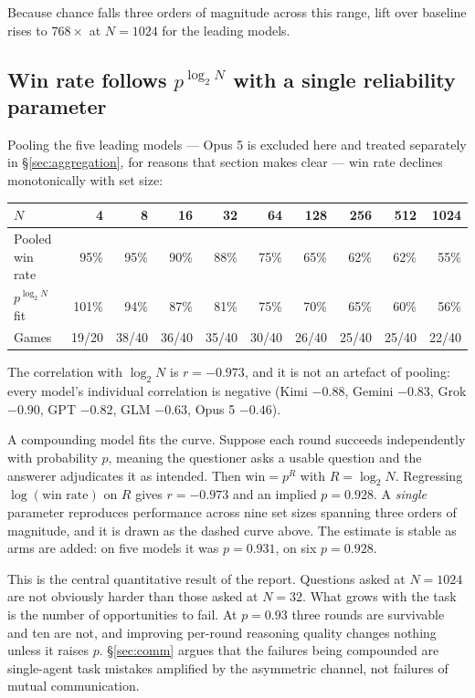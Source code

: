 \documentclass[11pt]{article}
\begin{document}
Because chance falls three orders of magnitude across this range, lift over
baseline rises to $768\times$ at $N=1024$ for the leading models.

\subsection{Win rate follows $p^{\log_2 N}$ with a single reliability parameter}
\label{sec:decay}

Pooling the five leading models --- Opus 5 is excluded here and treated separately
in \S\ref{sec:aggregation}, for reasons that section makes clear --- win rate
declines monotonically with set size:

\begin{center}\small
\begin{tabular}{lrrrrrrrrr}
\toprule
$N$ & 4 & 8 & 16 & 32 & 64 & 128 & 256 & 512 & 1024 \\
\midrule
Pooled win rate & 95\% & 95\% & 90\% & 88\% & 75\% & 65\% & 62\% & 62\% & 55\% \\
$p^{\log_2 N}$ fit & 101\% & 94\% & 87\% & 81\% & 75\% & 70\% & 65\% & 60\% & 56\% \\
Games & 19/20 & 38/40 & 36/40 & 35/40 & 30/40 & 26/40 & 25/40 & 25/40 & 22/40 \\
\bottomrule
\end{tabular}
\end{center}

The correlation with $\log_2 N$ is $r=-0.973$, and it is not an artefact of
pooling: every model's individual correlation is negative (Kimi $-0.88$, Gemini
$-0.83$, Grok $-0.90$, GPT $-0.82$, GLM $-0.63$, Opus 5 $-0.46$).

A compounding model fits the curve. Suppose each round succeeds independently
with probability $p$, meaning the questioner asks a usable question and the
answerer adjudicates it as intended. Then $\text{win} = p^{R}$ with
$R=\log_2 N$. Regressing $\log(\text{win rate})$ on $R$ gives $r=-0.973$ and an
implied $p=0.928$. A \emph{single} parameter reproduces performance across nine
set sizes spanning three orders of magnitude, and it is drawn as the dashed
curve above. The estimate is stable as arms are added: on five models it was
$p=0.931$, on six $p=0.928$.

This is the central quantitative result of the report. Questions asked at
$N{=}1024$ are not obviously harder than those asked at $N{=}32$. What grows
with the task is the number of opportunities to fail. At $p=0.93$ three rounds
are survivable and ten are not, and improving per-round reasoning quality
changes nothing unless it raises $p$. \S\ref{sec:comm} argues that the failures being
compounded are single-agent task mistakes amplified by the asymmetric channel,
not failures of mutual communication.
\end{document}

